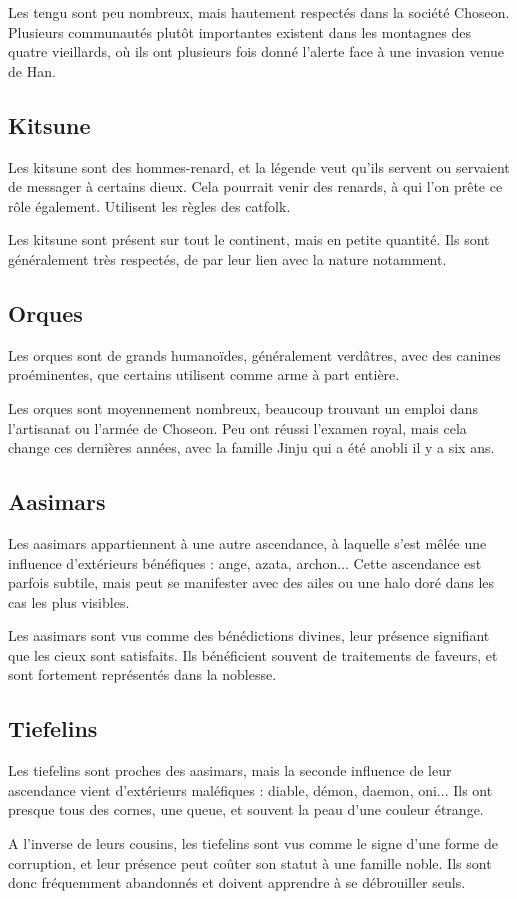 \documentclass[10pt,a4paper]{book}
\newcommand{\nomroyaume}{Choseon}
\begin{document}
Les tengu sont peu nombreux, mais hautement respectés dans la société \nomroyaume. Plusieurs communautés plutôt importantes existent dans les montagnes des quatre vieillards, où ils ont plusieurs fois donné l'alerte face à une invasion venue de Han.
\subsection{Kitsune}
Les kitsune sont des hommes-renard, et la légende veut qu'ils servent ou servaient de messager à certains dieux. Cela pourrait venir des renards, à qui l'on prête ce rôle également. Utilisent les règles des catfolk.

Les kitsune sont présent sur tout le continent, mais en petite quantité. Ils sont généralement très respectés, de par leur lien avec la nature notamment.
\subsection{Orques}
Les orques sont de grands humanoïdes, généralement verdâtres, avec des canines proéminentes, que certains utilisent comme arme à part entière. 

Les orques sont moyennement nombreux, beaucoup trouvant un emploi dans l'artisanat ou l'armée de \nomroyaume. Peu ont réussi l'examen royal, mais cela change ces dernières années, avec la famille Jinju qui a été anobli il y a six ans.
\subsection{Aasimars}
Les aasimars appartiennent à une autre ascendance, à laquelle s'est mêlée une influence d'extérieurs bénéfiques : ange, azata, archon... Cette ascendance est parfois subtile, mais peut se manifester avec des ailes ou une halo doré dans les cas les plus visibles.

Les aasimars sont vus comme des bénédictions divines, leur présence signifiant que les cieux sont satisfaits. Ils bénéficient souvent de traitements de faveurs, et sont fortement représentés dans la noblesse.
\subsection{Tiefelins}
Les tiefelins sont proches des aasimars, mais la seconde influence de leur ascendance vient d'extérieurs maléfiques : diable, démon, daemon, oni... Ils ont presque tous des cornes, une queue, et souvent la peau d'une couleur étrange.

A l'inverse de leurs cousins, les tiefelins sont vus comme le signe d'une forme de corruption, et leur présence peut coûter son statut à une famille noble. Ils sont donc fréquemment abandonnés et doivent apprendre à se débrouiller seuls.
\end{document}
